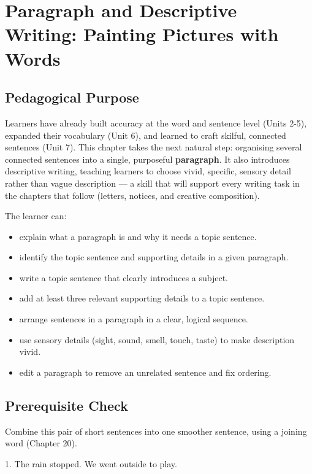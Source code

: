 
\chapter{Paragraph and Descriptive Writing: Painting Pictures with Words}

\section{Pedagogical Purpose}
Learners have already built accuracy at the word and sentence level (Units 2-5), expanded their vocabulary (Unit 6), and learned to craft skilful, connected sentences (Unit 7). This chapter takes the next natural step: organising several connected sentences into a single, purposeful \textbf{paragraph}. It also introduces descriptive writing, teaching learners to choose vivid, specific, sensory detail rather than vague description — a skill that will support every writing task in the chapters that follow (letters, notices, and creative composition).

\begin{learningobjectives}
The learner can:
\begin{itemize}
    \item explain what a paragraph is and why it needs a topic sentence.
    \item identify the topic sentence and supporting details in a given paragraph.
    \item write a topic sentence that clearly introduces a subject.
    \item add at least three relevant supporting details to a topic sentence.
    \item arrange sentences in a paragraph in a clear, logical sequence.
    \item use sensory details (sight, sound, smell, touch, taste) to make description vivid.
    \item edit a paragraph to remove an unrelated sentence and fix ordering.
\end{itemize}
\end{learningobjectives}

\section{Prerequisite Check}
\begin{quickcheck}
Combine this pair of short sentences into one smoother sentence, using a joining word (Chapter 20).

1. The rain stopped. We went outside to play.
\end{quickcheck}

